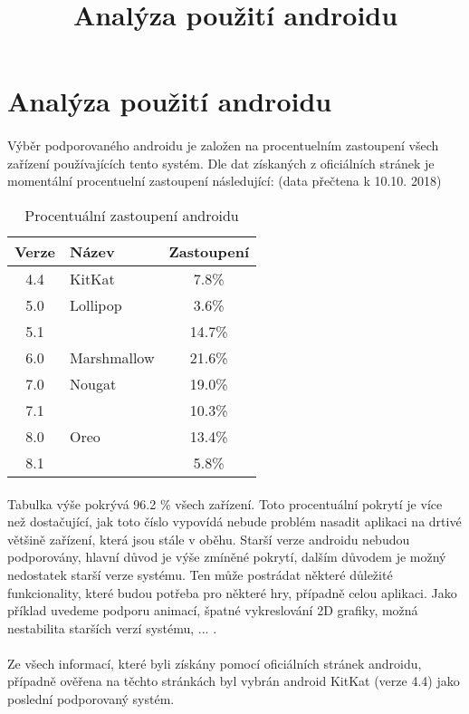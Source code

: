 \documentclass{article}
\title{Analýza použití androidu}
\author{}
\begin{document}
\maketitle
{}
\newpage
\section*{Analýza použití androidu}
\paragraph{} Výběr podporovaného androidu je založen na procentuelním zastoupení všech zařízení používajících tento systém. Dle dat získaných z oficiálních stránek je momentální procentuelní zastoupení následující:	(data přečtena k 10.10. 2018)

\begin{table}[h]
    \centering
    \renewcommand{\tablename}{Tabulka}
    \begin{tabular}{c|l|c}
        \toprule
        \textbf{Verze} & \textbf{Název} & \textbf{Zastoupení}\\
        \midrule
        4.4 & KitKat & 7.8\% \\
        5.0 & Lollipop & 3.6\% \\
        5.1 &  & 14.7\% \\
        6.0 & Marshmallow & 21.6\% \\
        7.0 & Nougat & 19.0\% \\
        7.1 &  & 10.3\% \\
        8.0 & Oreo & 13.4\% \\
        8.1 &  & 5.8\% \\
        \bottomrule
    \end{tabular}
    \caption{Procentuální zastoupení androidu}
    \label{Tabulka}
\end{table}

\paragraph{} Tabulka výše pokrývá 96.2 \% všech zařízení. Toto procentuální pokrytí je více než dostačující, jak toto číslo vypovídá nebude problém nasadit aplikaci na drtivé většině zařízení, která jsou stále v oběhu. Starší verze androidu nebudou podporovány, hlavní důvod je výše zmíněné pokrytí, dalším důvodem je možný nedostatek starší verze systému. Ten může postrádat některé důležité funkcionality, které budou potřeba pro některé hry, případně celou aplikaci. Jako příklad uvedeme podporu animací, špatné vykreslování 2D grafiky, možná nestabilita starších verzí systému, ... .

\paragraph{} Ze všech informací, které byli získány pomocí oficiálních stránek androidu, případně ověřena na těchto stránkách byl vybrán android KitKat (verze 4.4) jako poslední podporovaný systém. 

\end{document}
